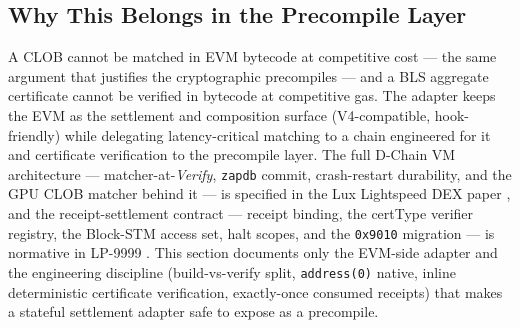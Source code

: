 \subsection{Why This Belongs in the Precompile Layer}

A CLOB cannot be matched in EVM bytecode at competitive cost --- the same
argument that justifies the cryptographic precompiles --- and a BLS
aggregate certificate cannot be verified in bytecode at competitive gas.
The adapter keeps the EVM as the settlement and composition surface
(V4-compatible, hook-friendly) while delegating latency-critical matching
to a chain engineered for it and certificate verification to the precompile
layer. The full D-Chain VM architecture --- matcher-at-\emph{Verify},
\texttt{zapdb} commit, crash-restart durability, and the GPU CLOB matcher
behind it --- is specified in the Lux Lightspeed DEX paper
\cite{lux-lightspeed-dex}, and the receipt-settlement contract --- receipt
binding, the certType verifier registry, the Block-STM access set, halt
scopes, and the \texttt{0x9010} migration --- is normative in LP-9999
\cite{lux-lp9999}. This section documents only the EVM-side adapter and the
engineering discipline (build-vs-verify split, \texttt{address(0)} native,
inline deterministic certificate verification, exactly-once consumed
receipts) that makes a stateful settlement adapter safe to expose as a
precompile.

